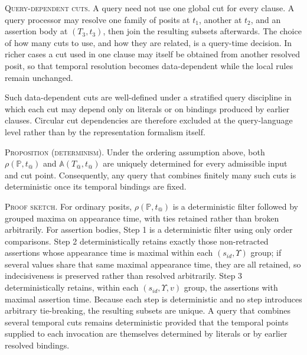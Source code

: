 \documentclass[a4paper,fleqn]{cas-sc}
\begin{document}
\textsc{Query-dependent cuts.} A query need not use one global cut for every clause. A query processor may resolve one family of posits at \(t_1\), another at \(t_2\), and an assertion body at \((T_3,t_3)\), then join the resulting subsets afterwards. The choice of how many cuts to use, and how they are related, is a query-time decision. In richer cases a cut used in one clause may itself be obtained from another resolved posit, so that temporal resolution becomes data-dependent while the local rules remain unchanged.

Such data-dependent cuts are well-defined under a stratified query discipline in which each cut may depend only on literals or on bindings produced by earlier clauses. Circular cut dependencies are therefore excluded at the query-language level rather than by the representation formalism itself.

\textsc{Proposition (determinism).} Under the ordering assumption above, both \(\rho(\mathbb{P}, t_@)\) and \(\mathbb{A}(T_@, t_@)\) are uniquely determined for every admissible input and cut point. Consequently, any query that combines finitely many such cuts is deterministic once its temporal bindings are fixed.

\textsc{Proof sketch.} For ordinary posits, \(\rho(\mathbb{P}, t_@)\) is a deterministic filter followed by grouped maxima on appearance time, with ties retained rather than broken arbitrarily. For assertion bodies, Step 1 is a deterministic filter using only order comparisons. Step 2 deterministically retains exactly those non-retracted assertions whose appearance time is maximal within each \((s_{id}, \Upsilon)\) group; if several values share that same maximal appearance time, they are all retained, so indecisiveness is preserved rather than resolved arbitrarily. Step 3 deterministically retains, within each \((s_{id}, \Upsilon, v)\) group, the assertions with maximal assertion time. Because each step is deterministic and no step introduces arbitrary tie-breaking, the resulting subsets are unique. A query that combines several temporal cuts remains deterministic provided that the temporal points supplied to each invocation are themselves determined by literals or by earlier resolved bindings.
\end{document}
